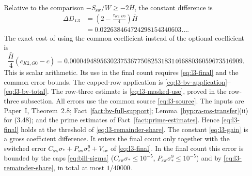Relative to the comparison $-S_{\mathrm{sw}}/W\ge-2\overline H$,
the constant difference is
\begin{equation}\label{eq:l3-gain}
\begin{aligned}
 \Delta D_{L3}&=\left(2-\frac{c_{K2,G0}}4\right)\overline H\\
 &=0.022638464724298154340603\ldots.
\end{aligned}
\end{equation}
The exact cost of using the common coefficient instead of the optional
coefficient is
\[
 \frac{\overline H}{4}(c_{K2,G0}-c)
 =0.000049489563023753677508253183146688036059673516909.
\]
This is scalar arithmetic. Its use in the final count requires \eqref{eq:l3-final}
and the common error bounds.
The capped-row application is \eqref{eq:l3-bv-application}--\eqref{eq:l3-bv-total}.
The row-three estimate is \eqref{eq:l3-masked-use}, proved in the
row-three subsection. All errors use the common source
\eqref{eq:l3-source}. The inputs are Paper~I, Theorem~2.8;
Fact~\ref{fact:bv-full-support}; Lemma~\ref{hyp:ra-ms-transfer}(ii) for
(3.48); and the prime estimates of Fact~\ref{fact:prime-estimates}.
Hence \eqref{eq:l3-final} holds at the
threshold of \eqref{eq:l3-remainder-share}. The constant \eqref{eq:l3-gain} is
a gross coefficient difference. It enters the final count only together
with the switched error $C_{\mathrm{sw}}\sigma_*+P_{\mathrm{sw}}\sigma_*^9
+V_{\mathrm{sw}}$ of \eqref{eq:l3-final}. In the final count
this error is bounded by the caps \eqref{eq:bill-sigma}
($C_{\mathrm{sw}}\sigma_*\le10^{-5}$, $P_{\mathrm{sw}}\sigma_*^9\le10^{-5}$)
and by \eqref{eq:l3-remainder-share}, in total at most $1/40000$.
